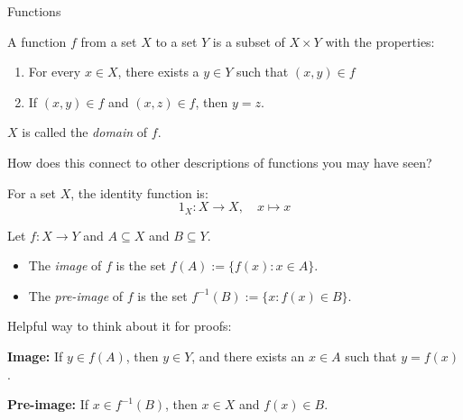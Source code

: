 \documentclass [aspectratio=169, handout]{beamer}
\begin{document}
\begin{frame}{Functions}
\begin{definition}
A function $f$ from a set $X$ to a set $Y$ is a subset of $X \times Y$ with the properties:
\begin{enumerate}
    \item For every $x \in X$, there exists a $y \in Y$ such that $(x,y) \in f$
    \item If $(x,y) \in f$ and $(x,z) \in f$, then $y = z$.
\end{enumerate}
$X$ is called the \emph{domain} of $f$.
\end{definition}
How does this connect to other descriptions of functions you may have seen?
\vspace{2em}

\begin{example}
For a set $X$, the identity function is:
$$ 1_X: X \to X, \quad x \mapsto x $$
\end{example}
\end{frame}



\begin{frame}
\begin{definition}
Let $f:X \to Y$ and $A \subseteq X$ and $B \subseteq Y$. 
\begin{itemize}
\item The \emph{image} of $f$ is the set $f(A) := \{f(x): x \in A \}$.
\item The \emph{pre-image} of $f$ is the set $f^{-1}(B) := \{x: f(x) \in B \}$.
\end{itemize}
\end{definition}

\vspace{1em}

Helpful way to think about it for proofs:

\vspace{0.5em}
\textbf{Image:} If $y \in f(A)$, then $y \in Y$, and there exists an $x \in A$ such that $y = f(x)$.

\vspace{0.5em}
\textbf{Pre-image:} If $x \in f^{-1}(B)$, then $x \in X$ and $f(x) \in B$.


\end{frame}
\end{document}
